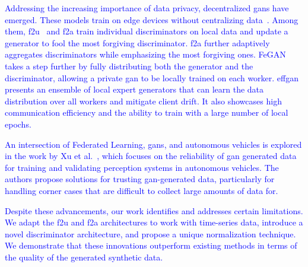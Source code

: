 \textcolor{blue}{
Addressing the increasing importance of data privacy, decentralized \glspl*{gan} have emerged. These models train on edge devices without centralizing data~\cite{hardy_md-gan_2019}. Among them, \gls*{f2u}~\cite{yonetani_decentralized_2019} and \gls*{f2a} train individual discriminators on local data and update a generator to fool the most forgiving discriminator. \gls*{f2a} further adaptively aggregates discriminators while emphasizing the most forgiving ones. FeGAN~\cite{guerraoui_fegan_2020} takes a step further by fully distributing both the generator and the discriminator, allowing a private \gls*{gan} to be locally trained on each worker. \gls*{effgan}~\cite{ekblom_effgan_2022} presents an ensemble of local expert generators that can learn the data distribution over all workers and mitigate client drift. It also showcases high communication efficiency and the ability to train with a large number of local epochs.}


\textcolor{blue}{
An intersection of Federated Learning, \glspl*{gan}, and autonomous vehicles is explored in the work by Xu et al.~\cite{xu_reliability_2021}, which focuses on the reliability of \gls*{gan} generated data for training and validating perception systems in autonomous vehicles. The authors propose solutions for trusting \gls*{gan}-generated data, particularly for handling corner cases that are difficult to collect large amounts of data for.}

\textcolor{blue}{
Despite these advancements, our work identifies and addresses certain limitations. We adapt the \gls*{f2u} and \gls*{f2a} architectures to work with time-series data, introduce a novel discriminator architecture, and propose a unique normalization technique. We demonstrate that these innovations outperform existing methods in terms of the quality of the generated synthetic data.}
